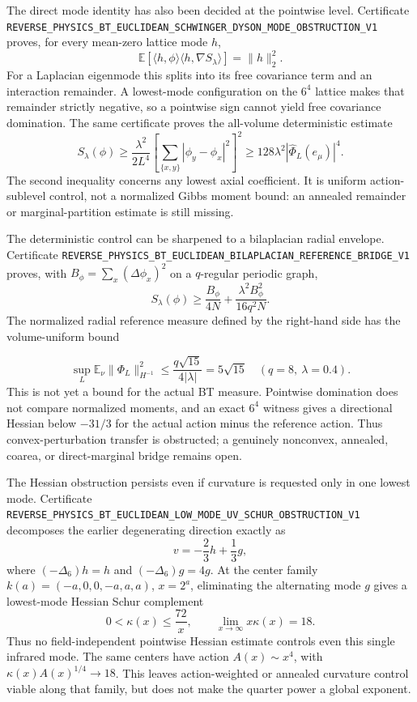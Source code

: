 \documentclass[11pt]{article}
\theoremstyle{definition}
\theoremstyle{remark}
\newcommand{\cert}[1]{\nolinkurl{#1}}
\begin{document}
The direct mode identity has also been decided at the pointwise level.
Certificate
\cert{REVERSE_PHYSICS_BT_EUCLIDEAN_SCHWINGER_DYSON_MODE_OBSTRUCTION_V1}
proves, for every mean-zero lattice mode \(h\),
\[
 \mathbb E[\langle h,\phi\rangle\langle h,\nabla S_\lambda\rangle]
 =\|h\|_2^2.
\]
For a Laplacian eigenmode this splits into its free covariance term and an
interaction remainder.  A lowest-mode configuration on the \(6^4\) lattice
makes that remainder strictly negative, so a pointwise sign cannot yield
free covariance domination.  The same certificate proves the all-volume
deterministic estimate
\[
 S_\lambda(\phi)\geq\frac{\lambda^2}{2L^4}
 \left[\sum_{\{x,y\}}|\phi_y-\phi_x|^2\right]^2
 \geq128\lambda^2|\widehat\Phi_L(e_\mu)|^4.
\]
The second inequality concerns any lowest axial coefficient.  It is uniform
action-sublevel control, not a normalized Gibbs moment bound: an annealed
remainder or marginal-partition estimate is still missing.

The deterministic control can be sharpened to a bilaplacian radial envelope.
Certificate
\cert{REVERSE_PHYSICS_BT_EUCLIDEAN_BILAPLACIAN_REFERENCE_BRIDGE_V1}
proves, with \(B_\phi=\sum_x(\Delta\phi_x)^2\) on a \(q\)-regular periodic
graph,
\[
 S_\lambda(\phi)\geq\frac{B_\phi}{4N}
       +\frac{\lambda^2B_\phi^2}{16q^2N}.
\]
The normalized radial reference measure defined by the right-hand side has
the volume-uniform bound

\[
 \sup_L\mathbb E_\nu\|\Phi_L\|_{H^{-1}}^2
 \leq\frac{q\sqrt{15}}{4|\lambda|}=5\sqrt{15}
 \quad(q=8,\ \lambda=0.4).
\]
This is not yet a bound for the actual BT measure.  Pointwise domination does
not compare normalized moments, and an exact \(6^4\) witness gives a
directional Hessian below \(-31/3\) for the actual action minus the reference
action.  Thus convex-perturbation transfer is obstructed; a genuinely
nonconvex, annealed, coarea, or direct-marginal bridge remains open.

The Hessian obstruction persists even if curvature is requested only in one
lowest mode.  Certificate
\cert{REVERSE_PHYSICS_BT_EUCLIDEAN_LOW_MODE_UV_SCHUR_OBSTRUCTION_V1}
decomposes the earlier degenerating direction exactly as
\[
 v=-\frac23h+\frac13g,
\]
where \((-\Delta_6)h=h\) and \((-\Delta_6)g=4g\).  At the center family
\(k(a)=(-a,0,0,-a,a,a)\), \(x=2^a\), eliminating the alternating mode \(g\)
gives a lowest-mode Hessian Schur complement
\[
 0<\kappa(x)\leq\frac{72}{x},\qquad
 \lim_{x\to\infty}x\kappa(x)=18.
\]
Thus no field-independent pointwise Hessian estimate controls even this
single infrared mode.  The same centers have action \(A(x)\sim x^4\), with
\(\kappa(x)A(x)^{1/4}\to18\).  This leaves action-weighted or annealed
curvature control viable along that family, but does not make the quarter
power a global exponent.
\end{document}
